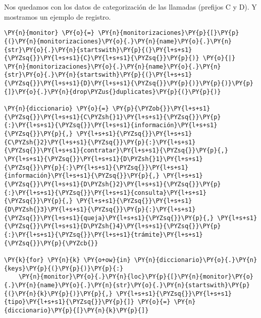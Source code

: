     Nos quedamos con los datos de categorización de las llamadas (prefijos C
y D). Y mostramos un ejemplo de registro.

\vspace{0.5cm}

    \begin{tcolorbox}[breakable, size=fbox, boxrule=1pt, pad at break*=1mm,colback=cellbackground, colframe=cellborder]
\begin{Verbatim}[commandchars=\\\{\}]
\PY{n}{monitor} \PY{o}{=} \PY{n}{monitorizaciones}\PY{p}{[}\PY{p}{(}\PY{n}{monitorizaciones}\PY{o}{.}\PY{n}{name}\PY{o}{.}\PY{n}{str}\PY{o}{.}\PY{n}{startswith}\PY{p}{(}\PY{l+s+s1}{\PYZsq{}}\PY{l+s+s1}{C}\PY{l+s+s1}{\PYZsq{}}\PY{p}{)} \PY{o}{|} \PY{n}{monitorizaciones}\PY{o}{.}\PY{n}{name}\PY{o}{.}\PY{n}{str}\PY{o}{.}\PY{n}{startswith}\PY{p}{(}\PY{l+s+s1}{\PYZsq{}}\PY{l+s+s1}{D}\PY{l+s+s1}{\PYZsq{}}\PY{p}{)}\PY{p}{)}\PY{p}{]}\PY{o}{.}\PY{n}{drop\PYZus{}duplicates}\PY{p}{(}\PY{p}{)}

\PY{n}{diccionario} \PY{o}{=} \PY{p}{\PYZob{}}\PY{l+s+s1}{\PYZsq{}}\PY{l+s+s1}{C\PYZsh{}1}\PY{l+s+s1}{\PYZsq{}}\PY{p}{:}\PY{l+s+s1}{\PYZsq{}}\PY{l+s+s1}{información}\PY{l+s+s1}{\PYZsq{}}\PY{p}{,} \PY{l+s+s1}{\PYZsq{}}\PY{l+s+s1}{C\PYZsh{}2}\PY{l+s+s1}{\PYZsq{}}\PY{p}{:}\PY{l+s+s1}{\PYZsq{}}\PY{l+s+s1}{contratar}\PY{l+s+s1}{\PYZsq{}}\PY{p}{,} \PY{l+s+s1}{\PYZsq{}}\PY{l+s+s1}{D\PYZsh{}1}\PY{l+s+s1}{\PYZsq{}}\PY{p}{:}\PY{l+s+s1}{\PYZsq{}}\PY{l+s+s1}{información}\PY{l+s+s1}{\PYZsq{}}\PY{p}{,} \PY{l+s+s1}{\PYZsq{}}\PY{l+s+s1}{D\PYZsh{}2}\PY{l+s+s1}{\PYZsq{}}\PY{p}{:}\PY{l+s+s1}{\PYZsq{}}\PY{l+s+s1}{consulta}\PY{l+s+s1}{\PYZsq{}}\PY{p}{,} \PY{l+s+s1}{\PYZsq{}}\PY{l+s+s1}{D\PYZsh{}3}\PY{l+s+s1}{\PYZsq{}}\PY{p}{:}\PY{l+s+s1}{\PYZsq{}}\PY{l+s+s1}{queja}\PY{l+s+s1}{\PYZsq{}}\PY{p}{,} \PY{l+s+s1}{\PYZsq{}}\PY{l+s+s1}{D\PYZsh{}4}\PY{l+s+s1}{\PYZsq{}}\PY{p}{:}\PY{l+s+s1}{\PYZsq{}}\PY{l+s+s1}{trámite}\PY{l+s+s1}{\PYZsq{}}\PY{p}{\PYZcb{}}

\PY{k}{for} \PY{n}{k} \PY{o+ow}{in} \PY{n}{diccionario}\PY{o}{.}\PY{n}{keys}\PY{p}{(}\PY{p}{)}\PY{p}{:}
    \PY{n}{monitor}\PY{o}{.}\PY{n}{loc}\PY{p}{[}\PY{n}{monitor}\PY{o}{.}\PY{n}{name}\PY{o}{.}\PY{n}{str}\PY{o}{.}\PY{n}{startswith}\PY{p}{(}\PY{n}{k}\PY{p}{)}\PY{p}{,} \PY{l+s+s1}{\PYZsq{}}\PY{l+s+s1}{tipo}\PY{l+s+s1}{\PYZsq{}}\PY{p}{]} \PY{o}{=} \PY{n}{diccionario}\PY{p}{[}\PY{n}{k}\PY{p}{]}
        

\end{Verbatim}
\end{tcolorbox}
